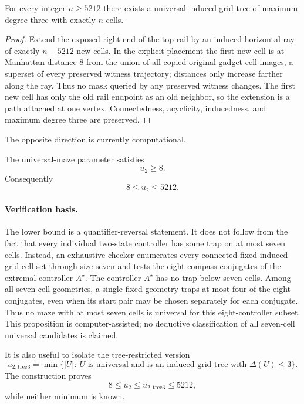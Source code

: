 \begin{corollary}
\label{cor:universal-exact-size}
For every integer $n\ge5212$ there exists a universal induced grid tree of maximum
degree three with exactly $n$ cells.
\end{corollary}

\begin{proof}
Extend the exposed right end of the top rail by an induced horizontal ray of exactly
$n-5212$ new cells.  In the explicit placement the first new cell is at Manhattan
distance $8$ from the union of all copied original gadget-cell images, a superset of
every preserved witness trajectory; distances only increase farther along the ray.
Thus no mask queried by any preserved witness changes.  The first new cell has only the
old rail endpoint as an old neighbor, so the extension is a path attached at one
vertex.  Connectedness, acyclicity, inducedness, and maximum degree three are
preserved.
\end{proof}

The opposite direction is currently computational.

\begin{proposition}
\label{prop:u2-lower-eight}
The universal-maze parameter satisfies
\[
  u_2\ge8.
\]
Consequently
\[
  \boxed{8\le u_2\le5212.}
\]
\end{proposition}

\paragraph{Verification basis.}
The lower bound is a quantifier-reversal statement.  It does not follow from the fact
that every individual two-state controller has some trap on at most seven cells.
Instead, an exhaustive checker enumerates every connected fixed induced grid cell set
through size seven and tests the eight compass conjugates of the extremal controller
$A^\star$.  The controller $A^\star$ has no trap below seven cells.  Among all
seven-cell geometries, a single fixed geometry traps at most four of the eight
conjugates, even when its start pair may be chosen separately for each conjugate.
Thus no maze with at most seven cells is universal for this eight-controller subset.
This proposition is computer-assisted; no deductive classification of all seven-cell
universal candidates is claimed.

It is also useful to isolate the tree-restricted version
\[
 u_{2,\mathrm{tree3}}
 =\min\bigl\{|U|:\ U\text{ is universal and is an induced grid tree with }
 \Delta(U)\le3\bigr\}.
\]
The construction proves
\[
  8\le u_2\le u_{2,\mathrm{tree3}}\le5212,
\]
while neither minimum is known.

